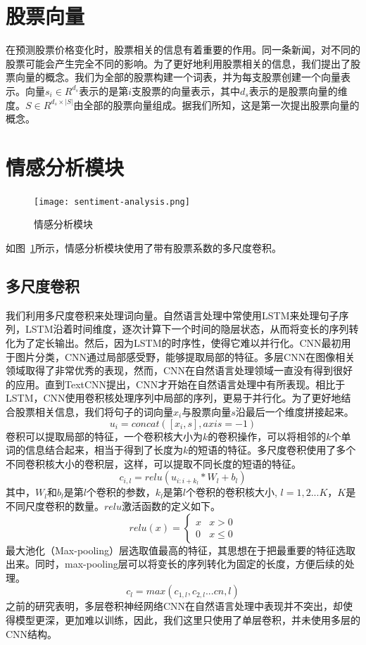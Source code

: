 \section{股票向量}
在预测股票价格变化时，股票相关的信息有着重要的作用。同一条新闻，对不同的股票可能会产生完全不同的影响。为了更好地利用股票相关的信息，我们提出了股票向量的概念。我们为全部的股票构建一个词表，并为每支股票创建一个向量表示。向量$s_i\in R ^ {d_s}$表示的是第$i$支股票的向量表示，其中$d_s$表示的是股票向量的维度。$S\in R ^ {d_s\times | S |}$由全部的股票向量组成。据我们所知，这是第一次提出股票向量的概念。
\section{情感分析模块}

\begin{figure}[ht]
    \centering
    \texttt{[image: sentiment-analysis.png]}
    \caption{情感分析模块}
    \label{fig: sentiment}
\end{figure}

如图~\ref{fig: sentiment}所示，情感分析模块使用了带有股票系数的多尺度卷积。

\subsection{多尺度卷积}
我们利用多尺度卷积来处理词向量。自然语言处理中常使用LSTM来处理句子序列，LSTM沿着时间维度，逐次计算下一个时间的隐层状态，从而将变长的序列转化为了定长输出。然后，因为LSTM的时序性，使得它难以并行化。CNN最初用于图片分类，CNN通过局部感受野，能够提取局部的特征。多层CNN在图像相关领域取得了非常优秀的表现，然而，CNN在自然语言处理领域一直没有得到很好的应用。直到TextCNN\cite{kim2014convolutional}提出，CNN才开始在自然语言处理中有所表现。相比于LSTM，CNN使用卷积核处理序列中局部的序列，更易于并行化。为了更好地结合股票相关信息，我们将句子的词向量$x_i$与股票向量$s$沿最后一个维度拼接起来。
\begin{equation}
    u_i = concat([x_i, s],axis=-1)
\end{equation}
卷积可以提取局部的特征，一个卷积核大小为$k$的卷积操作，可以将相邻的$k$个单词的信息结合起来，相当于得到了长度为$k$的短语的特征。多尺度卷积使用了多个不同卷积核大小的卷积层，这样，可以提取不同长度的短语的特征。
\begin{equation}
    c_{i, l} = relu(u_{i: i+k_l}*W_l+b_l)
\end{equation}
其中，$W_l$和$b_l$是第$l$个卷积的参数，$k_l$是第$l$个卷积的卷积核大小, $l = 1, 2...K$，$K$是不同尺度卷积的数量。$relu$激活函数的定义如下。
\begin{equation}
    relu(x) =\begin{cases}
        x & x > 0 \\
        0 & x\le 0
    \end{cases}
\end{equation}
最大池化（Max-pooling）层选取值最高的特征，其思想在于把最重要的特征选取出来。同时，max-pooling层可以将变长的序列转化为固定的长度，方便后续的处理。
\begin{equation}
    c_l = max(c_{1, l}, c_{2, l}...c{n, l})
\end{equation}
之前的研究表明\cite{kim2014convolutional}，多层卷积神经网络CNN在自然语言处理中表现并不突出，却使得模型更深，更加难以训练，因此，我们这里只使用了单层卷积，并未使用多层的CNN结构。
